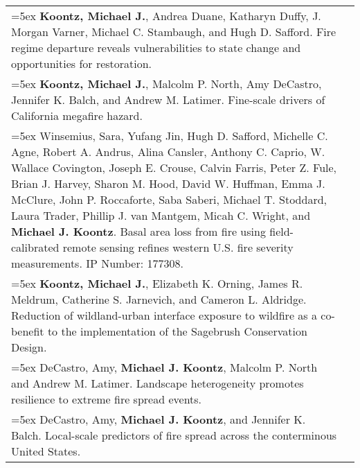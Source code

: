 \begin{longtable}{@{} >{\raggedright}p{5.25in} >{\raggedleft}X @{}}

\hangindent=5ex \textbf{Koontz, Michael J.}, Andrea Duane, Katharyn Duffy, J. Morgan Varner, Michael C. Stambaugh, and Hugh D. Safford. Fire regime departure reveals vulnerabilities to state change and opportunities for restoration. & \tabularnewline

\hangindent=5ex \textbf{Koontz, Michael J.}, Malcolm P. North, Amy DeCastro, Jennifer K. Balch, and Andrew M. Latimer. Fine-scale drivers of California megafire hazard.  & [\textcolor{blue}{\href{https://github.com/mikoontz/megafire-fine-scale-drivers}{GitHub}}] \tabularnewline

\hangindent=5ex Winsemius, Sara, Yufang Jin, Hugh D. Safford, Michelle C. Agne, Robert A. Andrus, Alina Cansler, Anthony C. Caprio, W. Wallace Covington, Joseph E. Crouse, Calvin Farris, Peter Z. Fule, Brian J. Harvey, Sharon M. Hood, David W. Huffman, Emma J. McClure, John P. Roccaforte, Saba Saberi, Michael T. Stoddard, Laura Trader, Phillip J. van Mantgem, Micah C. Wright, and \textbf{Michael J. Koontz}. Basal area loss from fire using field-calibrated remote sensing refines western U.S. fire severity measurements. IP Number: 177308. & \tabularnewline

\hangindent=5ex \textbf{Koontz, Michael J.}, Elizabeth K. Orning, James R. Meldrum, Catherine S. Jarnevich, and Cameron L. Aldridge. Reduction of wildland-urban interface exposure to wildfire as a co-benefit to the implementation of the Sagebrush Conservation Design. & \tabularnewline

\hangindent=5ex DeCastro, Amy, \textbf{Michael J. Koontz}, Malcolm P. North and Andrew M. Latimer. Landscape heterogeneity promotes resilience to extreme fire spread events. & \tabularnewline

\hangindent=5ex DeCastro, Amy, \textbf{Michael J. Koontz}, and Jennifer K. Balch. Local-scale predictors of fire spread across the conterminous United States. & \tabularnewline

% 
% 
% 

\end{longtable}

